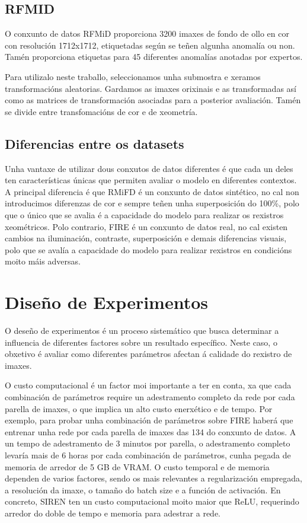 \subsection{RFMID}
\label{subsec:RFMID}

O conxunto de datos RFMiD \cite{RFMiD} proporciona 3200 imaxes de fondo de ollo en cor con resolución 1712x1712, etiquetadas según se teñen algunha anomalía ou non. 
Tamén proporciona etiquetas para 45 diferentes anomalías anotadas por expertos.

Para utilizalo neste traballo, seleccionamos unha submostra e xeramos transformacións aleatorias. Gardamos as imaxes orixinais e as transformadas así como as matrices de transformación asociadas para a posterior avaliación.
Tamén se divide entre transfomacións de cor e de xeometría.


\subsection{Diferencias entre os datasets}
\label{subsec:Diferencias entre os datasets}

Unha vantaxe de utilizar dous conxutos de datos diferentes é que cada un deles ten características únicas que permiten avaliar o modelo en diferentes contextos.
A principal diferencia é que RMiFD é un conxunto de datos sintético, no cal non introducimos diferenzas de cor e sempre teñen unha superposición do 100\%, polo que o único que se avalia é a capacidade do modelo para realizar os rexistros xeométricos.
Polo contrario, FIRE é un conxunto de datos real, no cal existen cambios na iluminación, contraste, superposición e demais diferencias visuais, polo que se avalía a capacidade do modelo para realizar rexistros en condicións moito máis adversas.

\section{Diseño de Experimentos}
\label{sec:Diseño de Experimentos}

O deseño de experimentos é un proceso sistemático que busca determinar a influencia de diferentes factores sobre un resultado específico. Neste caso, o obxetivo é avaliar como diferentes parámetros afectan á calidade do rexistro de imaxes.

O custo computacional é un factor moi importante a ter en conta, xa que cada combinación de parámetros require un adestramento completo da rede por cada parella de imaxes, o que implica un alto custo enerxético e de tempo.
Por exemplo, para probar unha combinación de parámetros sobre FIRE haberá que entrenar unha rede por cada parella de imaxes das 134 do conxunto de datos. 
A un tempo de adestramento de 3 minutos por parella, o adestramento completo levaría mais de 6 horas por cada combinación de parámetros, cunha pegada de memoria de arredor de 5 GB de VRAM.
O custo temporal e de memoria dependen de varios factores, sendo os mais relevantes a regularización empregada, a resolución da imaxe, o tamaño do batch size e a función de activación.
En concreto, SIREN ten un custo computacional moito maior que ReLU, requerindo arredor do doble de tempo e memoria para adestrar a rede.

